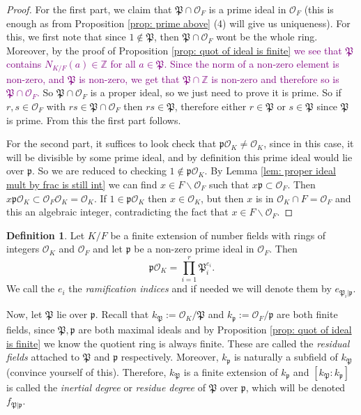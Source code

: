 \documentclass[11pt,a4paper]{report}
\theoremstyle{plain}
\theoremstyle{definition}
\newtheorem{defn}[subsection]{Definition}
\theoremstyle{definition}
\newcommand{\ZZ}{\mathbb{Z}}
\def \gothP{\mathfrak{P}}
\def\gothp{\mathfrak{p}}
\def \OO {\mathcal{O}}
\begin{document}
	
	\begin{proof}
		For the first part, we claim that $\gothP \cap \OO_F$ is a prime ideal in $\OO_F$ (this is enough as from Proposition \ref{prop: prime above} (4) will give us uniqueness). For this, we first note that since $1 \not \in \gothP$, then $\gothP \cap \OO_F$ wont be the whole ring. Moreover, by the proof of Proposition \ref{prop: quot of ideal is finite} \textcolor{purple}{we see that $\gothP$ contains $N_{K/F}(a) \in \ZZ$ for all $a \in \gothP$. Since the norm of a non-zero element is non-zero, and $\gothP$ is non-zero, we get that $\gothP \cap \ZZ$ is non-zero and therefore so is $\gothP \cap \OO_F$.} So $\gothP \cap \OO_F$ is a proper ideal, so we just need to prove it is prime. So if $r,s \in \OO_F$ with $rs \in \gothP \cap \OO_F$ then $rs \in \gothP$, therefore either $r \in \gothP$ or $s \in \gothP$ since $\gothP$ is prime. From this the first part follows.
		
		For the second part, it suffices to look check that $\gothp\OO_K \neq \OO_K$, since in this case, it will be divisible by some prime ideal, and by definition this prime ideal would lie over $\gothp$. So we are reduced to checking $1 \not \in \gothp\OO_K.$ By Lemma \ref{lem: proper ideal mult by frac is still int} we can find $x \in F \backslash \OO_F$ such that $x \gothp \subset \OO_F$. Then $x\gothp\OO_K \subset \OO_F\OO_K=\OO_K$. If $1 \in \gothp\OO_K$ then $x \in \OO_K$, but then $x$ is in $\OO_K \cap F=\OO_F$ and this an algebraic integer, contradicting the fact that $x \in F \backslash \OO_F$.
		
	\end{proof}
	
	\begin{defn}\label{defn: ram index and inert deg}
		Let $K/F$ be a finite extension of number fields with rings of integers $\OO_K$ and $\OO_F$ and let $\gothp$ be a non-zero prime ideal in $\OO_F$. Then \[\gothp\OO_K= \prod_{i=1}^r \gothP_i^{e_i}.\] We call the $e_i$ the \textit{ramification indices} and if needed we will denote them by $e_{\gothP_i|\gothp}$.
		
		Now, let $\gothP$ lie over $\gothp$. Recall that $k_{\gothP}:=\OO_K/\gothP$ and $k_\gothp:=\OO_F/\gothp$ are both finite fields, since $\gothP,\gothp$ are both maximal ideals and by Proposition \ref{prop: quot of ideal is finite} we know the quotient ring is always finite. These are called the \textit{residual fields} attached to $\gothP$ and $\gothp$ respectively. Moreover, $k_\gothp$ is naturally a subfield of $k_{\gothP}$ (convince yourself of this). Therefore, $k_{\gothP}$  is a finite extension of $k_{\gothp}$ and $[k_{\gothP}:k_{\gothp}]$ is called the \textit{inertial degree} or \textit{residue degree} of $\gothP$ over $\gothp$, which will be denoted $f_{\gothP|\gothp}$.
	\end{defn}
	
\end{document}
